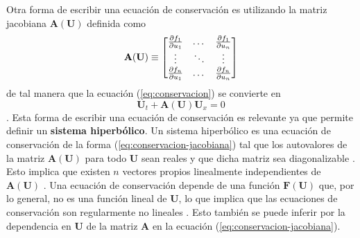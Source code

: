 Otra forma de escribir una ecuación de conservación es utilizando la matriz jacobiana $\mathbf{A(\mathbf{U})}$ definida como
\begin{equation}
	\mathbf{A(\mathbf{U})} \equiv
	\begin{bmatrix}
		\pdv{f_1}{u_1} & \dots & \pdv{f_1}{u_n} \\
		\vdots & \ddots & \vdots \\
		\pdv{f_n}{u_1} & \dots & \pdv{f_n}{u_n} \\
	\end{bmatrix}
\end{equation}
de tal manera que la ecuación (\ref{eq:conservacion}) se convierte en
\begin{equation}
	\mathbf{U}_{t} + \mathbf{A(\mathbf{U})}\mathbf{U}_{x} = 0
	\label{eq:conservacion-jacobiana}
\end{equation}.
Esta forma de escribir una ecuación de conservación es relevante ya que permite definir un \textbf{sistema hiperbólico}. Un sistema hiperbólico es una ecuación de conservación de la forma (\ref{eq:conservacion-jacobiana}) tal que los autovalores de la matriz $\mathbf{A(\mathbf{U})}$ para todo $\mathbf{U}$ sean reales y que dicha matriz sea diagonalizable \cite{Leveque}. Esto implica que existen $n$ vectores propios linealmente independientes de $\mathbf{A(\mathbf{U})}$ \cite{Leveque}.
Una ecuación de conservación depende de una función $\mathbf{F(\mathbf{U})}$ que, por lo general, no es una función lineal de $\mathbf{U}$, lo que implica que las ecuaciones de conservación son regularmente no lineales \cite{Leveque}. Esto también se puede inferir por la dependencia en $\mathbf{U}$ de la matriz $\mathbf{A}$ en la ecuación (\ref{eq:conservacion-jacobiana}).
